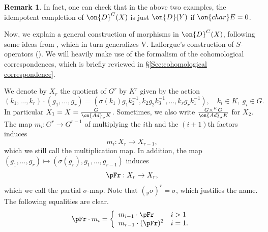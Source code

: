 \documentclass[11pt]{amsart}
\theoremstyle{definition}
\theoremstyle{definition}
\newtheorem{rmk}[thm]{Remark}
\theoremstyle{definition}
\numberwithin{equation}{subsection}
\newcommand{\Ad}{{\on{Ad}}}
\newcommand{\cha}{{\on{char}}}
\begin{document}
\begin{rmk}
\label{R:springer}
In fact, one can check that in the above two examples, the idempotent completion of $\on{D}^C(X)$ is just $\on{D}(Y)$ if $\cha E=0$. 
\end{rmk}


Now, we explain a general construction of morphisms in $\on{D}^{C}(X)$, following some ideas from \cite[\S 6]{XZ}, which in turn generalizes V. Lafforgue's construction of $S$-operators (\cite[\S 6]{La}). We will heavily make use of the formalism of the cohomological correspondences, which is briefly reviewed in \S \ref{Sec:cohomological correspondence}.



We denote by $X_r$ the quotient of $G^r$ by $K^r$ given by the action 
\begin{equation*}
(k_1,\ldots,k_r)\cdot (g_1,\ldots,g_r)=(\sigma(k_1)g_1k_2^{-1},k_2g_2k_3^{-1},\ldots,k_rg_rk_1^{-1}),\quad k_i\in K, \ g_i\in G.
\end{equation*}
In particular $X_1=X=\frac{G}{\Ad_\sigma K}$. Sometimes, we also write $\frac{G\times^K G}{\Ad_\sigma K}$ for $X_2$. 
The map $m_i:G^r\to G^{r-1}$ of multiplying the $i$th and the $(i+1)$th factors induces 
\begin{equation} 
\label{E: mult}
m_i: X_r\to X_{r-1},
\end{equation}
which we still call the multiplication map.
In addition, the map $(g_1,\ldots, g_r)\mapsto (\sigma(g_r),g_1,\ldots, g_{r-1})$ induces 
\begin{equation}
\label{E: psigma}
\pFr: X_r\to X_r,  
\end{equation}
which we call the partial $\sigma$-map. Note that $(_\mathrm{p}\sigma)^r=\sigma$, which justifies the name.
The following equalities are clear.
\begin{equation*}
\label{E:mult vs pFr}
\pFr \cdot m_i=\left\{ \begin{array}{ll}m_{i-1}\cdot\pFr &  i>1\\ m_{r-1}\cdot (\pFr)^2 & i=1. \end{array}\right.
\end{equation*}
\end{document}
